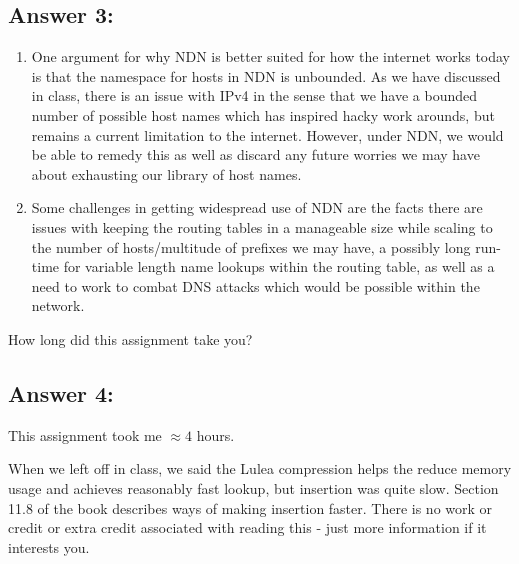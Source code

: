 \documentclass[10pt]{article}
\newenvironment{problem}[2][Problem]{\begin{trivlist}
\item[\hskip \labelsep {\bfseries #1}\hskip \labelsep {\bfseries #2.}]}{\end{trivlist}}
\begin{document}
\subsection*{Answer 3:}
\begin{enumerate}
    \item One argument for why NDN is better suited for how the internet works today is that the namespace for hosts in NDN is unbounded. As we have discussed in class, there is an issue with IPv4 in the sense that we have a bounded number of possible host names which has inspired hacky work arounds, but remains a current limitation to the internet. However, under NDN, we would be able to remedy this as well as discard any future worries we may have about exhausting our library of host names.
    \item Some challenges in getting widespread use of NDN are the facts there are issues with keeping the routing tables in a manageable size while scaling to the number of hosts/multitude of prefixes we may have, a possibly long run-time for variable length name lookups within the routing table, as well as a need to work to combat DNS attacks which would be possible within the network.  
\end{enumerate}
\begin{problem}{4}
How long did this assignment take you?
\end{problem}
\subsection*{Answer 4:}
This assignment took me $\approx 4$ hours.
\begin{problem}{5: Extra (optional) reading}
When we left off in class, we said the Lulea compression helps the reduce memory usage and achieves reasonably fast lookup, but insertion was quite slow. Section 11.8 of the book describes ways of making insertion faster. There is no work or credit or extra credit associated with reading this - just more information if it interests you.
\end{problem}
\end{document}
